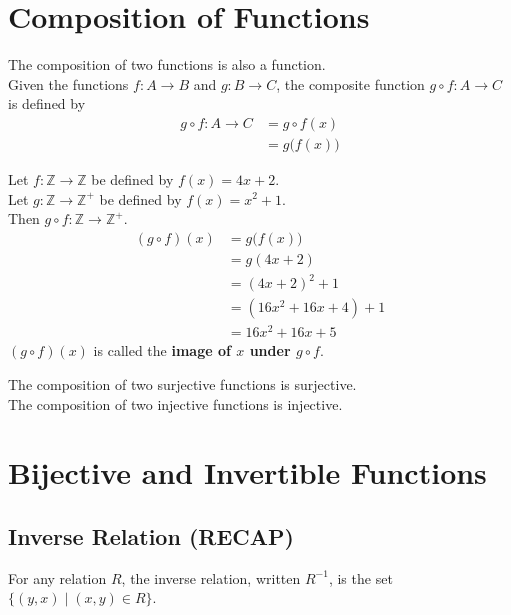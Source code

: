 \documentclass[../notes.tex]{subfiles}
\begin{document}
		\section{Composition of Functions}
			The composition of two functions is also a function.\\
			Given the functions $f: A \rightarrow B$ and $g: B \rightarrow C$, the composite function $g \circ f: A \rightarrow C$ is defined by
			\begin{align*}
				g \circ f: A \rightarrow C &= g \circ f(x)\\
				&= g\bigl(f(x)\bigr)
			\end{align*}
			\begin{example}
				Let $f: \mathbb{Z} \rightarrow \mathbb{Z}$ be defined by $f(x) = 4x + 2$.\\
				Let $g: \mathbb{Z} \rightarrow \mathbb{Z}^{+}$ be defined by $f(x) = x^{2} + 1$.\\
				Then $g \circ f: \mathbb{Z} \rightarrow \mathbb{Z}^{+}$.
				\begin{align*}
					(g \circ f)(x) &= g\bigl(f(x)\bigr)\\
					&= g(4x + 2)\\
					&= (4x + 2)^{2} + 1\\
					&= \left(16x^{2} + 16x + 4\right) + 1\\
					&= 16x^{2} + 16x + 5
				\end{align*}
				$(g \circ f)(x)$ is called the \textbf{image of $x$ under $g \circ f$}.
			\end{example}
			The composition of two surjective functions is surjective.\\
			The composition of two injective functions is injective.
		\section{Bijective and Invertible Functions}
			\subsection[Inverse Relation]{Inverse Relation (RECAP)}
				For any relation $R$, the inverse relation, written $R^{-1}$, is the set $\bigl\{(y, x) \mid (x, y) \in R\bigr\}$.
\end{document}
